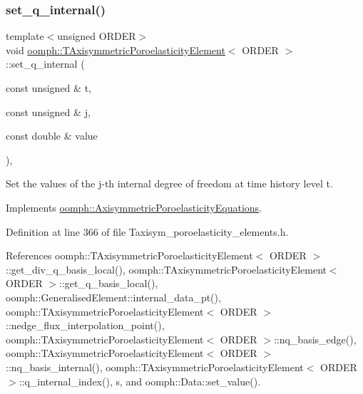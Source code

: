 \subsubsection{\texorpdfstring{set\+\_\+q\+\_\+internal()}{set\_q\_internal()}\hspace{0.1cm}{\footnotesize\ttfamily [2/2]}}
{\footnotesize\ttfamily template$<$unsigned O\+R\+D\+ER$>$ \\
void \hyperlink{classoomph_1_1TAxisymmetricPoroelasticityElement}{oomph\+::\+T\+Axisymmetric\+Poroelasticity\+Element}$<$ O\+R\+D\+ER $>$\+::set\+\_\+q\+\_\+internal (\begin{DoxyParamCaption}\item[{const unsigned \&}]{t,  }\item[{const unsigned \&}]{j,  }\item[{const double \&}]{value }\end{DoxyParamCaption})\hspace{0.3cm}{\ttfamily [inline]}, {\ttfamily [virtual]}}



Set the values of the j-\/th internal degree of freedom at time history level t. 



Implements \hyperlink{classoomph_1_1AxisymmetricPoroelasticityEquations_af63d9e9769c923b3f1184e80d3c62569}{oomph\+::\+Axisymmetric\+Poroelasticity\+Equations}.



Definition at line 366 of file Taxisym\+\_\+poroelasticity\+\_\+elements.\+h.



References oomph\+::\+T\+Axisymmetric\+Poroelasticity\+Element$<$ O\+R\+D\+E\+R $>$\+::get\+\_\+div\+\_\+q\+\_\+basis\+\_\+local(), oomph\+::\+T\+Axisymmetric\+Poroelasticity\+Element$<$ O\+R\+D\+E\+R $>$\+::get\+\_\+q\+\_\+basis\+\_\+local(), oomph\+::\+Generalised\+Element\+::internal\+\_\+data\+\_\+pt(), oomph\+::\+T\+Axisymmetric\+Poroelasticity\+Element$<$ O\+R\+D\+E\+R $>$\+::nedge\+\_\+flux\+\_\+interpolation\+\_\+point(), oomph\+::\+T\+Axisymmetric\+Poroelasticity\+Element$<$ O\+R\+D\+E\+R $>$\+::nq\+\_\+basis\+\_\+edge(), oomph\+::\+T\+Axisymmetric\+Poroelasticity\+Element$<$ O\+R\+D\+E\+R $>$\+::nq\+\_\+basis\+\_\+internal(), oomph\+::\+T\+Axisymmetric\+Poroelasticity\+Element$<$ O\+R\+D\+E\+R $>$\+::q\+\_\+internal\+\_\+index(), s, and oomph\+::\+Data\+::set\+\_\+value().

\mbox{\label{classoomph_1_1TAxisymmetricPoroelasticityElement_aac2d7977167e87f6e7c3e3f3fef4a60c}} 

